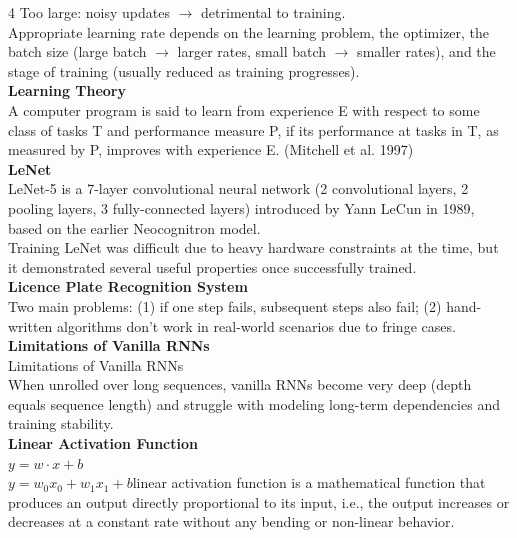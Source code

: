 \documentclass[8pt]{extarticle}
\begin{document}
\begin{multicols}{4}
Too large: noisy updates $\rightarrow$ detrimental to training.\\
Appropriate learning rate depends on the learning problem, the optimizer, the batch size (large batch $\rightarrow$ larger rates, small batch $\rightarrow$ smaller rates), and the stage of training (usually reduced as training progresses).\\
\vspace{2pt}\textbf{Learning Theory}\\
A computer program is said to learn from experience E with respect to some class of tasks T and performance measure P, if its performance at tasks in T, as measured by P, improves with experience E. (Mitchell et al. 1997)\\
\vspace{2pt}\textbf{LeNet}\\
LeNet-5 is a 7-layer convolutional neural network (2 convolutional layers, 2 pooling layers, 3 fully-connected layers) introduced by Yann LeCun in 1989, based on the earlier Neocognitron model.\\
Training LeNet was difficult due to heavy hardware constraints at the time, but it demonstrated several useful properties once successfully trained.\\
\vspace{2pt}\textbf{Licence Plate Recognition System}\\
Two main problems: (1) if one step fails, subsequent steps also fail; (2) hand-written algorithms don't work in real-world scenarios due to fringe cases.\\
\vspace{2pt}\textbf{Limitations of Vanilla RNNs}\\
Limitations of Vanilla RNNs\\
When unrolled over long sequences, vanilla RNNs become very deep (depth equals sequence length) and struggle with modeling long-term dependencies and training stability.\\
\vspace{2pt}\textbf{Linear Activation Function}\\
$y = w \cdot x + b$\\
$y = w_0 x_0 + w_1 x_1 + b$\A linear activation function is a mathematical function that produces an output directly proportional to its input, i.e., the output increases or decreases at a constant rate without any bending or non-linear behavior.\\


\end{multicols}
\end{document}
